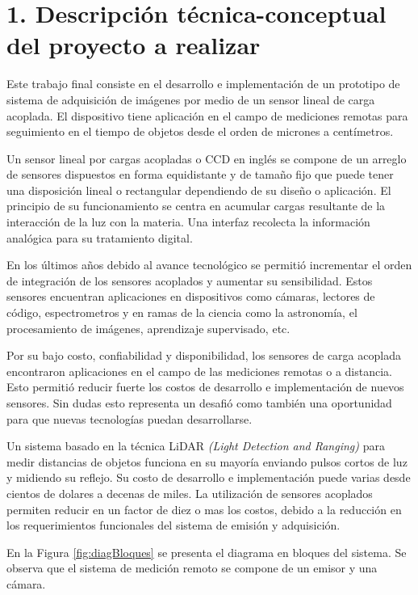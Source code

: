 \documentclass[
11pt, %
codirector, %
]{charter}
\begin{document}
\section{1. Descripción técnica-conceptual del proyecto a realizar}
\label{sec:descripcion}



Este trabajo final consiste en el desarrollo e implementación de un prototipo de sistema  de adquisición de imágenes por medio de un sensor lineal de carga acoplada. El dispositivo tiene aplicación en el campo de mediciones remotas para seguimiento en el tiempo de objetos desde el orden de  micrones a centímetros. 

Un sensor lineal por cargas acopladas o CCD en inglés se compone de un arreglo de sensores dispuestos en forma equidistante y de tamaño fijo que puede tener una disposición lineal o rectangular dependiendo de su diseño o aplicación. El principio de su funcionamiento se centra en acumular cargas resultante de la interacción de la luz con la materia. Una interfaz recolecta la información analógica para su tratamiento digital.

En los últimos años debido al avance tecnológico se permitió incrementar el orden de integración de los sensores acoplados y aumentar su sensibilidad. Estos sensores encuentran aplicaciones en dispositivos como cámaras, lectores de código, espectrometros y en ramas de la ciencia como la astronomía, el procesamiento de imágenes, aprendizaje supervisado, etc.

Por su bajo costo, confiabilidad y disponibilidad, los sensores de carga acoplada encontraron aplicaciones en el campo de las mediciones remotas o a distancia. Esto permitió reducir fuerte los costos de desarrollo e implementación de nuevos sensores. Sin dudas esto representa un desafió como también una oportunidad para que nuevas tecnologías puedan desarrollarse.

Un sistema  basado en la técnica  LiDAR \textit{(Light Detection and Ranging)} para medir distancias de objetos funciona en su mayoría enviando pulsos cortos de luz y midiendo su reflejo. Su costo de desarrollo e implementación puede varias desde cientos de dolares a decenas de miles. La utilización de sensores acoplados permiten reducir en un factor de diez o mas los costos, debido a la reducción en los requerimientos funcionales del sistema de emisión y adquisición. 

En la Figura \ref{fig:diagBloques} se presenta el diagrama en bloques del sistema. Se observa que el sistema de medición remoto se compone de un emisor y una cámara. 
\end{document}

